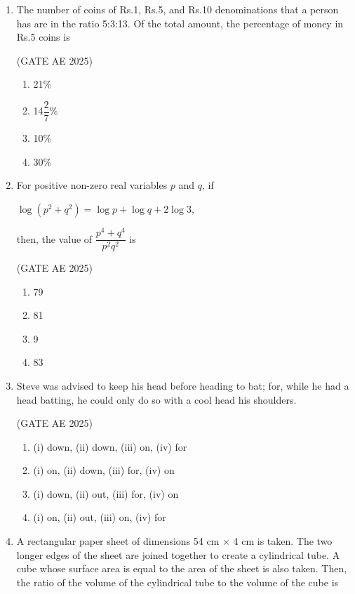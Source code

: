 \documentclass[journal,12pt,onecolumn]{IEEEtran}
\theoremstyle{remark}
\begin{document}
\begin{flushleft}
\begin{enumerate}
\item The number of coins of Rs.1, Rs.5, and Rs.10 denominations that a person has are in the ratio 5:3:13.
Of the total amount, the percentage of money in Rs.5 coins is

\hfill(GATE AE 2025)

\begin{enumerate}
    \item 21\%
    \item 14$\dfrac{2}{7}$\%
    \item 10\% 
    \item 30\%
\end{enumerate}

\item For positive non-zero real variables $p$ and $q$, if 
\begin{center}
    $\log(p^2 + q^2) = \log p + \log q + 2 \log 3$,
\end{center}
then, the value of $\dfrac{p^4 + q^4}{p^2 q^2}$ is 

\hfill(GATE AE 2025)

\begin{enumerate}
    \item  79 
    \item 81 
    \item 9
    \item 83
\end{enumerate}

\item Steve was advised to keep his head \underline{\hspace{1.5cm}} before heading \underline{\hspace{1.5cm}} to bat; for, while he had a head \underline{\hspace{1.5cm}} batting, he could only do so with a cool head \underline{\hspace{1.5cm}} his shoulders. 

\hfill(GATE AE 2025)

\begin{enumerate}
    \item (i) down, (ii) down, (iii) on, (iv) for
    \item (i) on, (ii) down, (iii) for, (iv) on
    \item (i) down, (ii) out, (iii) for, (iv) on
    \item (i) on, (ii) out, (iii) on, (iv) for
\end{enumerate}

\item A rectangular paper sheet of dimensions 54 cm $\times$ 4 cm is taken. The two longer edges of the sheet are joined together to create a cylindrical tube. A cube whose surface area is equal to the area of the sheet is also taken. Then, the ratio of the volume of the cylindrical tube to the volume of the cube is 


\end{enumerate}
\end{flushleft}
\end{document}

